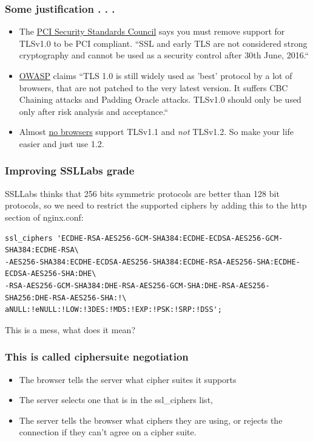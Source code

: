 \documentclass[9pt]{beamer}
\begin{document}
\begin{frame}
\frametitle{Some justification . . .}
\begin{itemize}
\item The \href{https://www.pcisecuritystandards.org/}{PCI Security Standards Council} says you must remove support for TLSv1.0 to be PCI compliant. ``SSL and early TLS are not considered strong cryptography and cannot be used as a security control after 30th June, 2016.``
\item \href{https://www.owasp.org/index.php/Transport_Layer_Protection_Cheat_Sheet}{OWASP} claims ``TLS 1.0 is still widely used as 'best' protocol by a lot of browsers, that are not patched to the very latest version. It suffers CBC Chaining attacks and Padding Oracle attacks. TLSv1.0 should only be used only after risk analysis and acceptance.``
\item Almost \href{https://en.wikipedia.org/wiki/Transport_Layer_Security\#Web_browsers}{no browsers} support TLSv1.1 and \emph{not} TLSv1.2. So make your life easier and just use 1.2.
\end{itemize}
\end{frame}

\begin{frame}[fragile]
\frametitle{Improving SSLLabs grade}
SSLLabs thinks that 256 bits symmetric protocols are better than 128 bit protocols, so we need to restrict the supported ciphers by adding this to the http section of nginx.conf:
\begin{verbatim}
ssl_ciphers 'ECDHE-RSA-AES256-GCM-SHA384:ECDHE-ECDSA-AES256-GCM-SHA384:ECDHE-RSA\
-AES256-SHA384:ECDHE-ECDSA-AES256-SHA384:ECDHE-RSA-AES256-SHA:ECDHE-ECDSA-AES256-SHA:DHE\
-RSA-AES256-GCM-SHA384:DHE-RSA-AES256-GCM-SHA:DHE-RSA-AES256-SHA256:DHE-RSA-AES256-SHA:!\
aNULL:!eNULL:!LOW:!3DES:!MD5:!EXP:!PSK:!SRP:!DSS';
\end{verbatim}
This is a mess, what does it mean?
\end{frame}

\begin{frame}
\frametitle{This is called ciphersuite negotiation}
\begin{itemize}
\item The browser tells the server what cipher suites it supports
\item The server selects one that is in the ssl\_ciphers list,
\item The server tells the browser what ciphers they are using, or rejects the connection if they can't agree on a cipher suite.
\end{itemize}
\end{frame}
\end{document}
